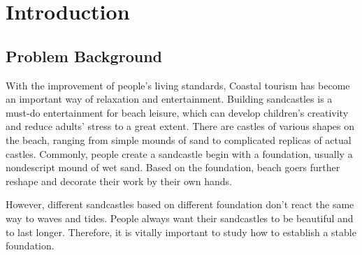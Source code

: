 \documentclass{mcmthesis}		    %
\begin{document}
	\maketitle				%
	\tableofcontents 		%
	\newpage 				%
	\setlength{\parskip}{0.5\baselineskip} %
	\newpage
	\hypersetup{linkcolor=linkblue,anchorcolor=linkblue,citecolor=linkblue}
	\section{Introduction}
	\subsection{Problem Background}
	With the improvement of people’s living standards, Coastal tourism has become an important way of relaxation and entertainment. Building sandcastles is a must-do entertainment for beach leisure, which can develop children's creativity and reduce adults' stress to a great extent. There are castles of various shapes on the beach, ranging from simple mounds of sand to complicated replicas of actual castles. Commonly, people create a sandcastle begin with a foundation, usually a nondescript mound of wet sand. Based on the foundation, beach goers further reshape and decorate their work by their own hands.
	
	However, different sandcastles based on different foundation don’t react the same way to waves and tides. People always want their sandcastles to be beautiful and to last longer. Therefore, it is vitally important to study how to establish a stable foundation.
	
\end{document}
